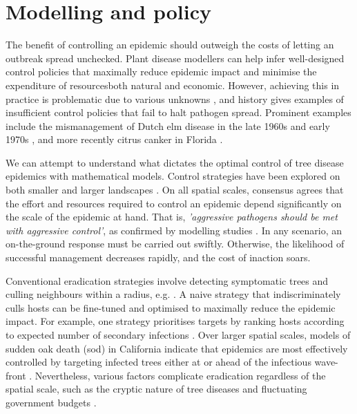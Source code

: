 \section{Modelling and policy}
\label{sec:modelling-and-policy}

The benefit of controlling an epidemic should outweigh the costs of letting an outbreak spread unchecked. 
Plant disease modellers can help infer well-designed control policies that maximally reduce epidemic impact and minimise the expenditure
of resources\textemdash both natural and economic. However, achieving this in practice is problematic due to various unknowns \cite{13-challenges}, and history gives examples of insufficient control policies that fail to halt pathogen spread. 
Prominent examples include the mismanagement of Dutch elm disease in the late 1960s and early 1970s \cite{dutch-elm-mismanage}, and more recently citrus canker in Florida \cite{schubert2001meeting}.

We can attempt to understand what dictates the optimal control of tree disease epidemics with mathematical models. 
Control strategies have been explored on both smaller \cite{risk-potential-control} and larger landscapes \cite{large-scale-control2}. 
On all spatial scales, consensus agrees that the effort and resources required to control an epidemic depend significantly on the scale of the epidemic at hand. That is, \textit{'aggressive pathogens should be met with aggressive control'}, as confirmed by modelling studies \cite{control-scale-matching, WEBIDEMICS}. 
In any scenario, an on-the-ground response must be carried out swiftly. Otherwise, the likelihood of successful management decreases rapidly, and the cost of inaction soars.

Conventional eradication strategies involve detecting symptomatic trees and culling neighbours within a radius, e.g. \cite{WEBIDEMICS}.
A naive strategy that indiscriminately culls hosts can be fine-tuned and optimised to maximally reduce the epidemic impact. 
For example, one strategy prioritises targets by ranking hosts according to expected number of secondary infections \cite{risk-potential-control}.
Over larger spatial scales, models of sudden oak death (\acrshort{sod}) in California indicate that epidemics are most effectively controlled by targeting infected trees either at or ahead of the infectious wave-front \cite{large-scale-control}.
Nevertheless, various factors complicate eradication regardless of the spatial scale, such as the cryptic nature of tree diseases and fluctuating government budgets \cite{control-theory, control-theory-application}.

